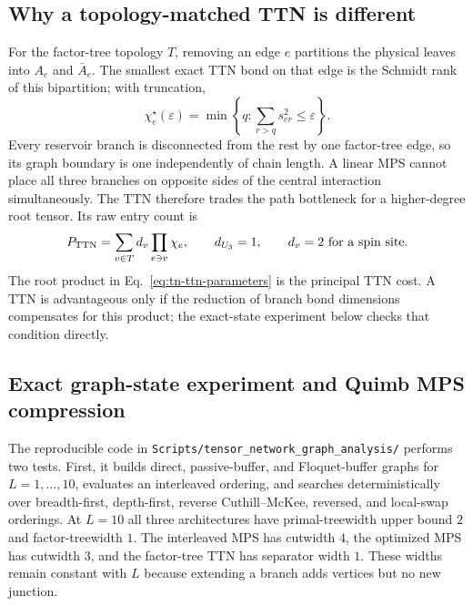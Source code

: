\documentclass[11pt,a4paper]{article}
\theoremstyle{plain}
\theoremstyle{definition}
\theoremstyle{remark}
\begin{document}
\subsection{Why a topology-matched TTN is different}
For the factor-tree topology $T$, removing an edge $e$ partitions the
physical leaves into $A_e$ and $\bar A_e$.  The smallest exact TTN bond
on that edge is the Schmidt rank of this bipartition; with truncation,
\begin{equation}
 \chi_e^\star(\varepsilon)
 =\min\left\{q:\sum_{r>q}s_{e r}^2\leq\varepsilon\right\}.
 \label{eq:tn-ttn-chi}
\end{equation}
Every reservoir branch is disconnected from the rest by one factor-tree
edge, so its graph boundary is one independently of chain length.  A
linear MPS cannot place all three branches on opposite sides of the
central interaction simultaneously.  The TTN therefore trades the path
bottleneck for a higher-degree root tensor.  Its raw entry count is
\begin{equation}
 P_{\rm TTN}=\sum_{v\in T}d_v\prod_{e\ni v}\chi_e,
 \qquad d_{U_3}=1,\qquad d_v=2\text{ for a spin site}.
 \label{eq:tn-ttn-parameters}
\end{equation}
The root product in Eq.~\eqref{eq:tn-ttn-parameters} is the principal TTN
cost.  A TTN is advantageous only if the reduction of branch bond
dimensions compensates for this product; the exact-state experiment
below checks that condition directly.

\subsection{Exact graph-state experiment and Quimb MPS compression}
The reproducible code in
\texttt{Scripts/tensor\_network\_graph\_analysis/} performs two tests.
First, it builds direct, passive-buffer, and Floquet-buffer graphs for
$L=1,\ldots,10$, evaluates an interleaved ordering, and searches
deterministically over breadth-first, depth-first, reverse
Cuthill--McKee, reversed, and local-swap orderings.  At $L=10$ all three
architectures have primal-treewidth upper bound $2$ and factor-treewidth
$1$.  The interleaved MPS has cutwidth $4$, the optimized MPS has
cutwidth $3$, and the factor-tree TTN has separator width $1$.  These
widths remain constant with $L$ because extending a branch adds vertices
but no new junction.
\end{document}
